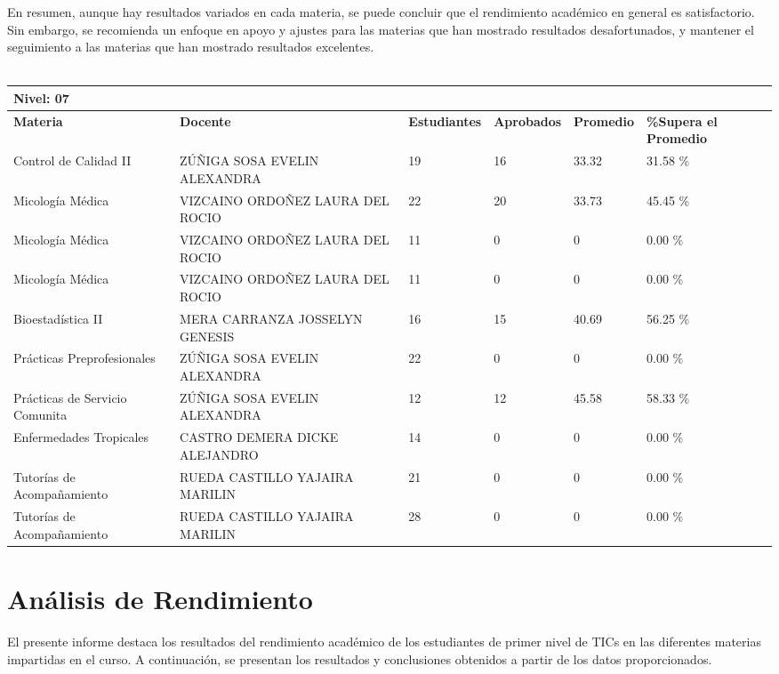 En resumen, aunque hay resultados variados en cada materia, se puede concluir que el rendimiento académico en general es satisfactorio. Sin embargo, se recomienda un enfoque en apoyo y ajustes para las materias que han mostrado resultados desafortunados, y mantener el seguimiento a las materias que han mostrado resultados excelentes.\\
\vspace{1cm}\\\small
\begin{tabularx}{\textwidth}{|p{2.5cm}|p{2.5cm}|X|X|X|X|}
\hline
\multicolumn{6}{|X|}{\textbf{Nivel: 07 }}\\\hline\textbf{Materia} & \textbf{Docente} & \textbf{Estudiantes} & \textbf{Aprobados} & \textbf{Promedio} & \textbf{\%Supera el Promedio} \\ \hline
Control de Calidad II & ZÚÑIGA SOSA EVELIN ALEXANDRA & 19 & 16 & 33.32 & 31.58 \%\\ \hline
Micología Médica & VIZCAINO ORDOÑEZ LAURA DEL ROCIO  & 22 & 20 & 33.73 & 45.45 \%\\ \hline
Micología Médica & VIZCAINO ORDOÑEZ LAURA DEL ROCIO  & 11 & 0 & 0 & 0.00 \%\\ \hline
Micología Médica & VIZCAINO ORDOÑEZ LAURA DEL ROCIO  & 11 & 0 & 0 & 0.00 \%\\ \hline
Bioestadística II & MERA CARRANZA JOSSELYN GENESIS & 16 & 15 & 40.69 & 56.25 \%\\ \hline
Prácticas Preprofesionales & ZÚÑIGA SOSA EVELIN ALEXANDRA & 22 & 0 & 0 & 0.00 \%\\ \hline
Prácticas de Servicio Comunita & ZÚÑIGA SOSA EVELIN ALEXANDRA & 12 & 12 & 45.58 & 58.33 \%\\ \hline
Enfermedades Tropicales & CASTRO DEMERA DICKE ALEJANDRO & 14 & 0 & 0 & 0.00 \%\\ \hline
Tutorías de Acompañamiento & RUEDA CASTILLO YAJAIRA MARILIN & 21 & 0 & 0 & 0.00 \%\\ \hline
Tutorías de Acompañamiento & RUEDA CASTILLO YAJAIRA MARILIN & 28 & 0 & 0 & 0.00 \%\\ \hline
\end{tabularx}

\vspace{1cm}
\section{Análisis de Rendimiento}
El presente informe destaca los resultados del rendimiento académico de los estudiantes de primer nivel de TICs en las diferentes materias impartidas en el curso. A continuación, se presentan los resultados y conclusiones obtenidos a partir de los datos proporcionados.

